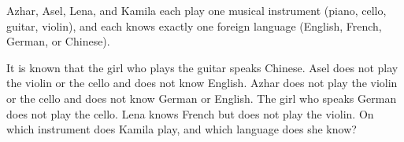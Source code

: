 Azhar, Asel, Lena, and Kamila each play one musical instrument (piano, cello, guitar, violin), and each knows exactly one foreign language (English, French, German, or Chinese).



It is known that the girl who plays the guitar speaks Chinese. Asel does not play the violin or the cello and does not know English. Azhar does not play the violin or the cello and does not know German or English. The girl who speaks German does not play the cello. Lena knows French but does not play the violin. On which instrument does Kamila play, and which language does she know?
